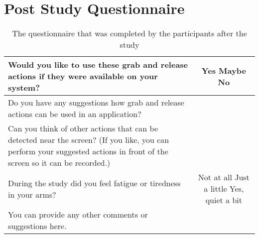 \section{Post Study Questionnaire}
\begin{table}[h]
 \centering
 \caption{The questionnaire that was completed by the participants after the study}
\begin{tabular}{|p{3 in}|c|}
\hline
Would you like to use these grab and release actions if they were available on your system?
&
Yes \hspace{5 mm}
Maybe \hspace{5 mm}
No
\\
\hline
Do you have any suggestions how grab and release actions can be used in an application?
&
\\
\hline
Can you think of other actions that can be detected near the screen? (If you like, you can perform your suggested actions in front of the screen so it can be recorded.)
&
\\
\hline
During the study did you feel fatigue or tiredness in your arms?
&
Not at all \hspace{5 mm}
Just a little \hspace{5 mm}
Yes, quiet a bit
\\
\hline
You can provide any other comments or suggestions here.
&
\\
\hline
\end{tabular} 
\end{table}